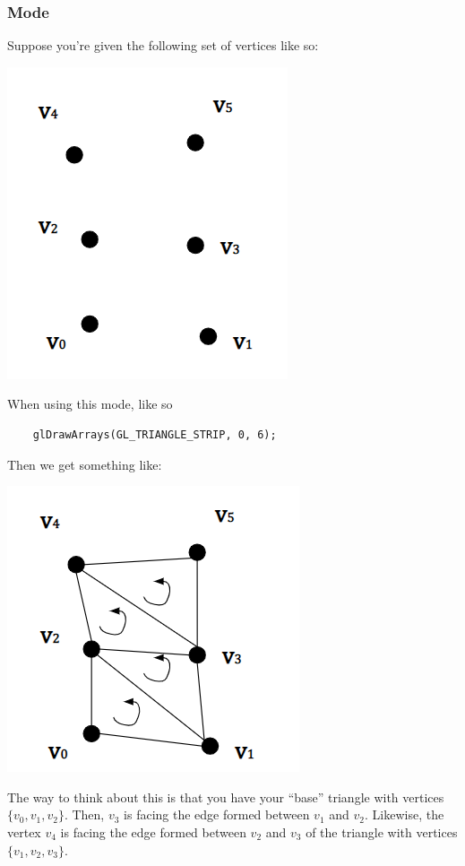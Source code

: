 \documentclass[letterpaper]{article}
\begin{document}
\subsubsection{ Mode}
Suppose you're given the following set of vertices like so: 
\begin{center}
    \includegraphics[scale=0.5]{../assets/triangle4.png}
\end{center}

When using this mode, like so 
\begin{verbatim}
    glDrawArrays(GL_TRIANGLE_STRIP, 0, 6);
\end{verbatim}
Then we get something like: 
\begin{center}
    \includegraphics[scale=0.5]{../assets/triangle5.png}
\end{center}

The way to think about this is that you have your ``base'' triangle with vertices $\{v_0, v_1, v_2\}$. Then, $v_3$ is facing the edge formed between $v_1$ and $v_2$. Likewise, the vertex $v_4$ is facing the edge formed between $v_2$ and $v_3$ of the triangle with vertices $\{v_1, v_2, v_3\}$. 
\end{document}
